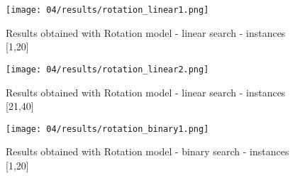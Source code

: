  \begin{figure}[H]
    \centering
    \texttt{[image: 04/results/rotation\_linear1.png]}
    \caption{
      Results obtained with Rotation model - linear search - instances [1,20]
    }
    \label{fig:SAT_results_rotation_linear1}
  \end{figure}
  \begin{figure}[H]
    \centering
    \texttt{[image: 04/results/rotation\_linear2.png]}
    \caption{
      Results obtained with Rotation model - linear search - instances [21,40]
    }
    \label{fig:SAT_results_rotation_linear2}
  \end{figure}   
  \begin{figure}[H]
    \centering
    \texttt{[image: 04/results/rotation\_binary1.png]}
    \caption{
      Results obtained with Rotation model - binary search - instances [1,20]
    }
    \label{fig:SAT_results_rotation_binary1}
  \end{figure}
